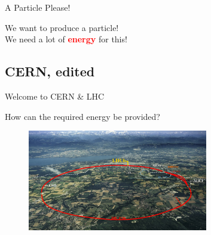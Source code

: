 \begin{frame}{A Particle Please!}

    \begin{center}
   \Large We want to produce a particle!\\
    
    \Large We need a lot of \textbf{\textcolor{red}{energy}} for this!
        
    \end{center}
    
\end{frame}
\subsection{CERN, edited}
\begin{frame}{Welcome to CERN \& LHC}

  \begin{center}
   \Large How can the required energy be provided?
    \end{center}
    
    \begin{figure}[h]
        \centering
        \includegraphics[width=0.7\textwidth]{Figures Introductory Lecture/LHCb Detector/LHC.jpg}
        \label{fig:CERN_LHC}
    \end{figure}
\end{frame}

